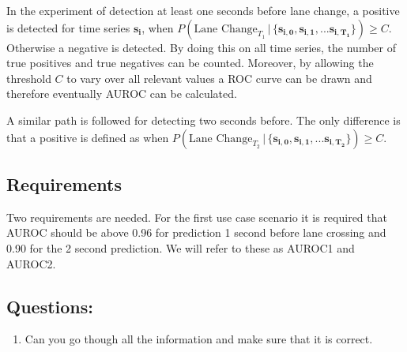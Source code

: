 \documentclass{article}
\theoremstyle{theorem}
\theoremstyle{definition}
\newcommand{\bu}[1]{\mathbf{#1}}
\newcommand{\bv}[1]{\bm{#1}}
\begin{document}
In the experiment of detection at least one seconds before lane change, a positive is detected for time series $\bu{s_i}$, when  $P(\mbox{Lane Change}_{T_1} \,|\, \{ \bv{s_{i,0}}, \bv{s_{i,1}}, ... \bv{s_{i,T_1}} \}) \geq C$.  Otherwise a negative is detected.  By doing this on all time series, the number of true positives and true negatives can be counted. Moreover, by allowing the threshold $C$ to vary over all relevant values a ROC curve can be drawn and therefore eventually AUROC can be calculated.

A similar path is followed for detecting two seconds before.  The only difference is that a positive is defined as when  $P(\mbox{Lane Change}_{T_2} \,|\, \{ \bv{s_{i,0}}, \bv{s_{i,1}}, ... \bv{s_{i,T_2}} \}) \geq C$.

\subsection*{Requirements}
Two requirements are needed.  For the first use case scenario it is required that AUROC should be above 0.96 for prediction 1 second before lane crossing and 0.90 for the 2 second prediction.  We will refer to these as AUROC1 and AUROC2.  

\subsection*{Questions: }
\begin{enumerate}
\item Can you go though all the information and make sure that it is correct.
\end{enumerate}


%
%
%
%



\end{document}
